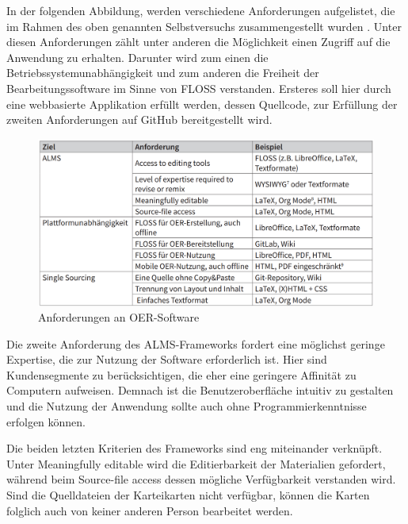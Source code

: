 In der folgenden Abbildung, werden verschiedene Anforderungen aufgelistet, die im Rahmen des oben genannten Selbstversuchs zusammengestellt wurden \cite{Lechtenborger.2019}. Unter diesen Anforderungen zählt unter anderen die Möglichkeit einen Zugriff auf die Anwendung zu erhalten. Darunter wird zum einen die Betriebssystemunabhängigkeit und zum anderen die Freiheit der Bearbeitungssoftware im Sinne von FLOSS verstanden. Ersteres soll hier durch eine webbasierte Applikation erfüllt werden, dessen Quellcode, zur Erfüllung der zweiten Anforderungen auf GitHub bereitgestellt wird. 

\begin{figure}[h]
\begin{center}
\includegraphics[width = 16cm]{alms_framework.png}
\caption{Anforderungen an OER-Software \cite{Lechtenborger.2019}}
\label{Anforderungen an OER-Software}

\end{center}
\end{figure}


Die zweite Anforderung des ALMS-Frameworks fordert eine möglichst geringe Expertise, die zur Nutzung der Software erforderlich ist. Hier sind Kundensegmente zu berücksichtigen, die eher eine geringere Affinität zu Computern aufweisen. Demnach ist die Benutzeroberfläche intuitiv zu gestalten und die Nutzung der Anwendung sollte auch ohne Programmierkenntnisse erfolgen können.

Die beiden letzten Kriterien des Frameworks sind eng miteinander verknüpft. Unter \glqq Meaningfully editable \grqq{} wird die Editierbarkeit der Materialien gefordert, während beim \glqq Source-file access \grqq{} dessen mögliche Verfügbarkeit verstanden wird. Sind die Quelldateien der Karteikarten nicht verfügbar, können die Karten folglich auch von keiner anderen Person bearbeitet werden. \\

